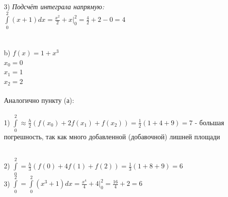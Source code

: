 \documentclass{article}
\begin{document}
3) \large\textit{Подсчёт интеграла напрямую:}\\
\normalsize
$ \int\limits^2_0 (x + 1)dx = \frac{x^2}{2} + x |^2_0 = \frac{4}{2} + 2 - 0 = 4 $\\
\\\\
\Large b) $ f(x) = 1 + x^3 $\\
\normalsize
$ x_0 = 0 $\\
$ x_1 = 1 $\\
$ x_2 = 2 $\\\\
Аналогично пункту (а):\\\\
1) $ \int\limits^2_0 \approx \frac{h}{2} (f(x_0) + 2f(x_1) + f(x_2)) = \frac{1}{2} (1+4+9) = 7 $ - большая погрешность, так как много добавленной (добавочной) лишней площади\\
\begin{figure}[h!]
\end{figure}
\\
2) $ \int\limits^2_0 = \frac{h}{3} (f(0) + 4f(1) + f(2)) = \frac{1}{3} (1+8+9) = 6 $\\
3) $ \int\limits^2_0 = \int\limits^2_0 (x^3 + 1)dx = \frac{x^4}{4} + 4 |^2_0 = \frac{16}{4} + 2 = 6 $
\end{document}
